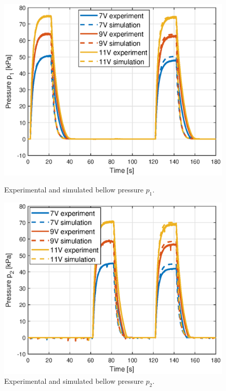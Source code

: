 \begin{figure}[H] 
    \begin{minipage}[b]{0.49\linewidth}
     \centering
    \includegraphics[width=\linewidth]{Figures/Chapter5/p1verif.eps} 
    \caption{Experimental and simulated bellow pressure $p_1$. } 
    \label{fig5:p1} 
       \end{minipage} 
    \begin{minipage}[b]{0.49\linewidth}
     \centering
    \includegraphics[width=\linewidth]{Figures/Chapter5/p2verif.eps} 
    \caption{Experimental and simulated bellow pressure $p_2$. } 
    \label{fig5:p2} 
    \end{minipage} 
\end{figure}




